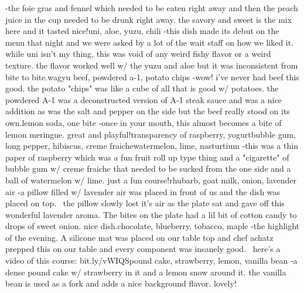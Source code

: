 \documentclass[paper=a4, fontsize=11pt]{jhwhw} %
\begin{document}
\begin{itemize}
\begin{enumerate}
-the foie gras and fennel which needed to be eaten right away and then the peach juice in the cup needed to be drunk right away. the savory and sweet is the mix here and it tasted nice!uni, aloe, yuzu, chili -this dish made its debut on the menu that night and we were asked by a lot of the wait staff on how we liked it. while uni isn't my thing, this was void of any weird fishy flavor or a weird texture. the flavor worked well w/ the yuzu and aloe but it was inconsistent from bite to bite.wagyu beef, powdered a-1, potato chips -wow! i've never had beef this good. the potato "chips" was like a cube of all that is good w/ potatoes. the powdered A-1 was a deconstructed version of A-1 steak sauce and was a nice addition as was the salt and pepper on the side but the beef really stood on its own.lemon soda, one bite -once in your mouth, this almost becomes a bite of lemon meringue. great and playful!transparency of raspberry, yogurtbubble gum, long pepper, hibiscus, creme fraichewatermelon, lime, nasturtium -this was a thin paper of raspberry which was a fun fruit roll up type thing and a "cigarette" of bubble gum w/ creme fraiche that needed to be sucked from the one side and a ball of watermelon w/ lime. just a fun course!rhubarb, goat milk, onion, lavender air -a pillow filled w/ lavender air was placed in front of us and the dish was placed on top.  the pillow slowly lost it's air as the plate sat and gave off this wonderful lavender aroma. The bites on the plate had a lil bit of cotton candy to drops of sweet onion. nice dish.chocolate, blueberry, tobacco, maple -the highlight of the evening. A silicone mat was placed on our table top and chef achatz prepped this on our table and every component was insanely good.  here's a video of this course: bit.ly/vWIQSpound cake, strawberry, lemon, vanilla bean -a dense pound cake w/ strawberry in it and a lemon snow around it. the vanilla bean is used as a fork and adds a nice background flavor. lovely!


\end{enumerate}
\end{itemize}
\end{document}
